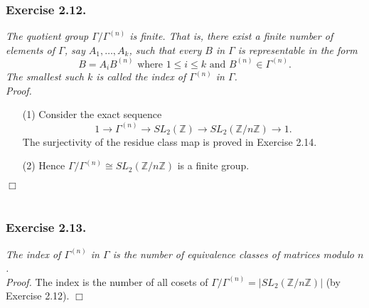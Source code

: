 \documentclass{article}
\begin{document}



\subsubsection*{Exercise 2.12.}
\emph{The quotient group $\Gamma/\Gamma^{(n)}$ is finite.
That is, there exist a finite number of elements of $\Gamma$,
say $A_1, \ldots, A_k$,
such that every $B$ in $\Gamma$ is representable in the form
\[
  B = A_i B^{(n)}
  \text{ where } 1 \leq i \leq k
  \text{ and } B^{(n)} \in \Gamma^{(n)}.
\]
The smallest such $k$ is called the index of $\Gamma^{(n)}$ in $\Gamma$.} \\



\emph{Proof.}
\begin{enumerate}
\item[(1)]
  Consider the exact sequence
  \[
    1 \to \Gamma^{(n)} \to SL_2(\mathbb{Z}) \to SL_2(\mathbb{Z}/n\mathbb{Z}) \to 1.
  \]
  The surjectivity of the residue class map is proved in Exercise 2.14.

\item[(2)]
  Hence $\Gamma/\Gamma^{(n)} \cong SL_2(\mathbb{Z}/n\mathbb{Z})$ is a finite group.
\end{enumerate}
$\Box$ \\\\






\subsubsection*{Exercise 2.13.}
\emph{The index of $\Gamma^{(n)}$ in $\Gamma$ is
the number of equivalence classes of matrices modulo $n$.} \\



\emph{Proof.}
  The index is the number of all cosets of $\Gamma/\Gamma^{(n)} = |SL_2(\mathbb{Z}/n\mathbb{Z})|$
  (by Exercise 2.12).
$\Box$ \\\\



\end{document}
